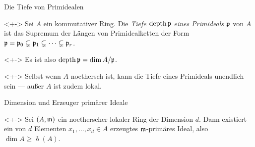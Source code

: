 \begin{frame}{Die Tiefe von Primidealen}
	\begin{definition}<+->
		Sei \(A\) ein kommutativer Ring. Die \emph{Tiefe \(\operatorname{depth} \mathfrak{p}\) eines Primideals \(\mathfrak{p}\)} von
		\(A\) ist das Supremum der Längen von Primidealketten der Form \(\mathfrak{p} = \mathfrak{p}_0 \subsetneq \mathfrak{p}_1
		\subsetneq \dotsb \subsetneq \mathfrak{p}_r\).
	\end{definition}
	\begin{visibleenv}<+->
		Es ist also \(\operatorname{depth} \mathfrak{p} = \dim A/\mathfrak{p}\).
	\end{visibleenv}
	\begin{remark}<+->
		Selbst wenn \(A\) noethersch ist, kann die Tiefe eines  Primideals unendlich sein --- außer \(A\) ist zudem lokal.
	\end{remark}
\end{frame}

\begin{frame}{Dimension und Erzeuger primärer Ideale}
	\begin{proposition}<+->
		Sei \((A, \mathfrak{m})\) ein noetherscher lokaler Ring der Dimension \(d\). Dann existiert ein von
		\(d\) Elementen \(x_1, \dotsc, x_d \in A\) erzeugtes \(\mathfrak{m}\)-primäres Ideal, also \(\dim A \ge \updelta(A)\).
	\end{proposition}
\end{frame}

